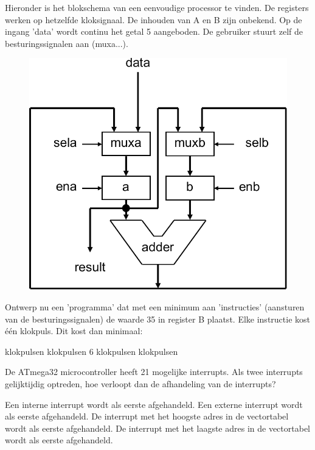 \documentclass[a4paper,12pt,fleqn,dutch,mimicwordtwentyten]{tisdexam}
\begin{document}
\begin{questions}
\question
\label{opg:opg17}
Hieronder is het blokschema van een eenvoudige processor te vinden. De registers werken op
hetzelfde kloksignaal. De inhouden van A en B zijn onbekend. Op de ingang 'data' wordt
continu het getal 5 aangeboden. De gebruiker stuurt zelf de besturingssignalen aan (muxa...).
\begin{figure}[H]
  \centering
    \includegraphics[scale=0.55]{pINLMIC_eenvoudige_rekenaar.pdf}
\end{figure}
Ontwerp nu een 'programma' dat met een minimum aan 'instructies' (aansturen van de
besturingssignalen) de waarde 35 in register B plaatst. Elke instructie kost \'{e}\'{e}n
klokpuls. Dit kost dan minimaal:
\begin{choices}
	 klokpulsen
	 klokpulsen
	\CorrectChoice \label{ans:opg17} 6 klokpulsen
	 klokpulsen
\end{choices}


\question
\label{opg:opg18}
De ATmega32 microcontroller heeft 21 mogelijke interrupts. Als twee interrupts gelijktijdig
optreden, hoe verloopt dan de afhandeling van de interrupts?
\begin{choices}
	\choice Een interne interrupt wordt als eerste afgehandeld.
	\choice Een externe interrupt wordt als eerste afgehandeld.
	\choice De interrupt met het hoogste adres in de vectortabel wordt als eerste afgehandeld.
	\CorrectChoice \label{ans:opg18} De interrupt met het laagste adres in de vectortabel wordt als eerste afgehandeld.
\end{choices}



\end{questions}
\end{document}
